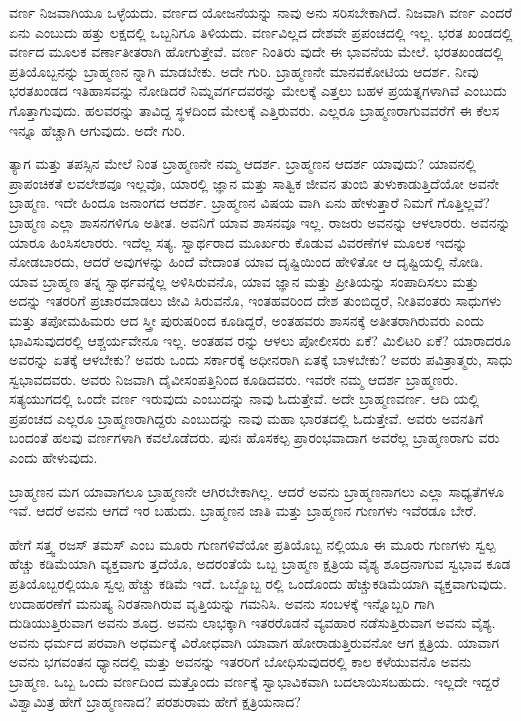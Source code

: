 ವರ್ಣ ನಿಜವಾಗಿಯೂ ಒಳ್ಳೆಯದು. ವರ್ಣದ ಯೋಜನೆಯನ್ನು ನಾವು ಅನು ಸರಿಸಬೇಕಾಗಿದೆ. ನಿಜವಾಗಿ ವರ್ಣ ಎಂದರೆ ಏನು ಎಂಬುದು ಹತ್ತು ಲಕ್ಷದಲ್ಲಿ ಒಬ್ಬನಿಗೂ ತಿಳಿಯದು. ವರ್ಣವಿಲ್ಲದ ದೇಶವೇ ಪ್ರಪಂಚದಲ್ಲಿ ಇಲ್ಲ. ಭರತ ಖಂಡದಲ್ಲಿ ವರ್ಣದ ಮೂಲಕ ವರ್ಣಾತೀತರಾಗಿ ಹೋಗುತ್ತೇವೆ. ವರ್ಣ ನಿಂತಿರು ವುದೇ ಈ ಭಾವನೆಯ ಮೇಲೆ. ಭರತಖಂಡದಲ್ಲಿ ಪ್ರತಿಯೊಬ್ಬನನ್ನು ಬ್ರಾಹ್ಮಣನ ನ್ನಾಗಿ ಮಾಡಬೇಕು. ಅದೇ ಗುರಿ. ಬ್ರಾಹ್ಮಣನೇ ಮಾನವಕೋಟಿಯ ಆದರ್ಶ. ನೀವು ಭರತಖಂಡದ ಇತಿಹಾಸವನ್ನು ನೋಡಿದರೆ ನಿಮ್ನವರ್ಗದವರನ್ನು ಮೇಲಕ್ಕೆ ಎತ್ತಲು ಬಹಳ ಪ್ರಯತ್ನಗಳಾಗಿವೆ ಎಂಬುದು ಗೊತ್ತಾಗುವುದು. ಹಲವರನ್ನು ತಾವಿದ್ದ ಸ್ಥಳದಿಂದ ಮೇಲಕ್ಕೆ ಎತ್ತಿರುವರು. ಎಲ್ಲರೂ ಬ್ರಾಹ್ಮಣರಾಗುವವರೆಗೆ ಈ ಕೆಲಸ ಇನ್ನೂ ಹೆಚ್ಚಾಗಿ ಆಗುವುದು. ಅದೇ ಗುರಿ.

ತ್ಯಾಗ ಮತ್ತು ತಪಸ್ಸಿನ ಮೇಲೆ ನಿಂತ ಬ್ರಾಹ್ಮಣನೇ ನಮ್ಮ ಆದರ್ಶ. ಬ್ರಾಹ್ಮಣನ ಆದರ್ಶ ಯಾವುದು? ಯಾವನಲ್ಲಿ ಪ್ರಾಪಂಚಿಕತೆ ಲವಲೇಶವೂ ಇಲ್ಲವೊ, ಯಾರಲ್ಲಿ ಜ್ಞಾನ ಮತ್ತು ಸಾತ್ವಿಕ ಜೀವನ ತುಂಬಿ ತುಳುಕಾಡುತ್ತಿದೆಯೋ ಅವನೇ ಬ್ರಾಹ್ಮಣ. ಇದೇ ಹಿಂದೂ ಜನಾಂಗದ ಆದರ್ಶ. ಬ್ರಾಹ್ಮಣನ ವಿಷಯ ವಾಗಿ ಏನು ಹೇಳುತ್ತಾರೆ ನಿಮಗೆ ಗೊತ್ತಿಲ್ಲವೆ? ಬ್ರಾಹ್ಮಣ ಎಲ್ಲಾ ಶಾಸನಗಳಿಗೂ ಅತೀತ. ಅವನಿಗೆ ಯಾವ ಶಾಸನವೂ ಇಲ್ಲ. ರಾಜರು ಅವನನ್ನು ಆಳಲಾರರು. ಅವನನ್ನು ಯಾರೂ ಹಿಂಸಿಸಲಾರರು. ಇದೆಲ್ಲ ಸತ್ಯ. ಸ್ವಾರ್ಥರಾದ ಮೂರ್ಖರು ಕೊಡುವ ವಿವರಣೆಗಳ ಮೂಲಕ ಇದನ್ನು ನೋಡಬಾರದು, ಆದರೆ ಅವುಗಳನ್ನು ಹಿಂದೆ ವೇದಾಂತ ಯಾವ ದೃಷ್ಟಿಯಿಂದ ಹೇಳಿತೋ ಆ ದೃಷ್ಟಿಯಲ್ಲಿ ನೋಡಿ. ಯಾವ ಬ್ರಾಹ್ಮಣ ತನ್ನ ಸ್ವಾರ್ಥವನ್ನೆಲ್ಲ ಅಳಿಸಿರುವನೊ, ಯಾವ ಜ್ಞಾನ ಮತ್ತು ಪ್ರೀತಿಯನ್ನು ಸಂಪಾದಿಸಲು ಮತ್ತು ಅದನ್ನು ಇತರರಿಗೆ ಪ್ರಚಾರಮಾಡಲು ಜೀವಿ ಸಿರುವನೊ, ಇಂತಹವರಿಂದ ದೇಶ ತುಂಬಿದ್ದರೆ, ನೀತಿವಂತರು ಸಾಧುಗಳು ಮತ್ತು ತಪೋಮಹಿಮರು ಆದ ಸ್ತ್ರೀ ಪುರುಷರಿಂದ ಕೂಡಿದ್ದರೆ, ಅಂತಹವರು ಶಾಸನಕ್ಕೆ ಅತೀತರಾಗಿರುವರು ಎಂದು ಭಾವಿಸುವುದರಲ್ಲಿ ಆಶ್ಚರ್ಯವೇನೂ ಇಲ್ಲ. ಅಂತಹವ ರನ್ನು ಆಳಲು ಪೋಲೀಸರು ಏಕೆ? ಮಿಲಿಟರಿ ಏಕೆ? ಯಾರಾದರೂ ಅವರನ್ನು ಏತಕ್ಕೆ ಆಳಬೇಕು? ಅವರು ಒಂದು ಸರ್ಕಾರಕ್ಕೆ ಅಧೀನರಾಗಿ ಏತಕ್ಕೆ ಬಾಳಬೇಕು? ಅವರು ಪವಿತ್ರಾತ್ಮರು, ಸಾಧು ಸ್ವಭಾವದವರು. ಅವರು ನಿಜವಾಗಿ ದೈವೀಸಂಪತ್ತಿನಿಂದ ಕೂಡಿದವರು. ಇವರೇ ನಮ್ಮ ಆದರ್ಶ ಬ್ರಾಹ್ಮಣರು. ಸತ್ಯಯುಗದಲ್ಲಿ ಒಂದೇ ವರ್ಣ ಇರುವುದು ಎಂಬುದನ್ನು ನಾವು ಓದುತ್ತೇವೆ. ಅದೇ ಬ್ರಾಹ್ಮಣವರ್ಣ. ಆದಿ ಯಲ್ಲಿ ಪ್ರಪಂಚದ ಎಲ್ಲರೂ ಬ್ರಾಹ್ಮಣರಾಗಿದ್ದರು ಎಂಬುದನ್ನು ನಾವು ಮಹಾ ಭಾರತದಲ್ಲಿ ಓದುತ್ತೇವೆ. ಅವರು ಅವನತಿಗೆ ಬಂದಂತೆ ಹಲವು ವರ್ಣಗಳಾಗಿ ಕವಲೊಡೆದರು. ಪುನಃ ಹೊಸಕಲ್ಪ ಪ್ರಾರಂಭವಾದಾಗ ಅವರೆಲ್ಲ ಬ್ರಾಹ್ಮಣರಾಗು ವರು ಎಂದು ಹೇಳುವುದು.

ಬ್ರಾಹ್ಮಣನ ಮಗ ಯಾವಾಗಲೂ ಬ್ರಾಹ್ಮಣನೇ ಆಗಿರಬೇಕಾಗಿಲ್ಲ. ಆದರೆ ಅವನು ಬ್ರಾಹ್ಮಣನಾಗಲು ಎಲ್ಲಾ ಸಾಧ್ಯತೆಗಳೂ ಇವೆ. ಆದರೆ ಅವನು ಆಗದೆ ಇರ ಬಹುದು. ಬ್ರಾಹ್ಮಣನ ಜಾತಿ ಮತ್ತು ಬ್ರಾಹ್ಮಣನ ಗುಣಗಳು ಇವೆರಡೂ ಬೇರೆ.

ಹೇಗೆ ಸತ್ತ್ವ ರಜಸ್ ತಮಸ್ ಎಂಬ ಮೂರು ಗುಣಗಳಿವೆಯೋ ಪ್ರತಿಯೊಬ್ಬ ನಲ್ಲಿಯೂ ಈ ಮೂರು ಗುಣಗಳು ಸ್ವಲ್ಪ ಹೆಚ್ಚು ಕಡಿಮೆಯಾಗಿ ವ್ಯಕ್ತವಾಗು ತ್ತದೆಯೊ, ಅದರಂತೆಯೆ ಒಬ್ಬ ಬ್ರಾಹ್ಮಣ ಕ್ಷತ್ರಿಯ ವೈಶ್ಯ ಶೂದ್ರನಾಗುವ ಸ್ವಭಾವ ಕೂಡ ಪ್ರತಿಯೊಬ್ಬರಲ್ಲಿಯೂ ಸ್ವಲ್ಪ ಹೆಚ್ಚು ಕಡಿಮೆ ಇದೆ. ಒಬ್ಬೊಬ್ಬ ರಲ್ಲಿ ಒಂದೊಂದು ಹೆಚ್ಚುಕಡಿಮೆಯಾಗಿ ವ್ಯಕ್ತವಾಗುವುದು. ಉದಾಹರಣೆಗೆ ಮನುಷ್ಯ ನಿರತನಾಗಿರುವ ವೃತ್ತಿಯನ್ನು ಗಮನಿಸಿ. ಅವನು ಸಂಬಳಕ್ಕೆ ಇನ್ನೊಬ್ಬರಿ ಗಾಗಿ ದುಡಿಯುತ್ತಿರುವಾಗ ಅವನು ಶೂದ್ರ. ಅವನು ಲಾಭಕ್ಕಾಗಿ ಇತರರೊಡನೆ ವ್ಯವಹಾರ ನಡೆಸುತ್ತಿರುವಾಗ ಅವನು ವೈಶ್ಯ. ಅವನು ಧರ್ಮದ ಪರವಾಗಿ ಅಧರ್ಮಕ್ಕೆ ವಿರೋಧವಾಗಿ ಯಾವಾಗ ಹೋರಾಡುತ್ತಿರುವನೋ ಆಗ ಕ್ಷತ್ರಿಯ. ಯಾವಾಗ ಅವನು ಭಗವಂತನ ಧ್ಯಾನದಲ್ಲಿ ಮತ್ತು ಅವನನ್ನು ಇತರರಿಗೆ ಬೋಧಿಸುವುದರಲ್ಲಿ ಕಾಲ ಕಳೆಯುವನೊ ಅವನು ಬ್ರಾಹ್ಮಣ. ಒಬ್ಬ ಒಂದು ವರ್ಣದಿಂದ ಮತ್ತೊಂದು ವರ್ಣಕ್ಕೆ ಸ್ವಾಭಾವಿಕವಾಗಿ ಬದಲಾಯಿಸಬಹುದು. ಇಲ್ಲದೇ ಇದ್ದರೆ ವಿಶ್ವಾಮಿತ್ರ ಹೇಗೆ ಬ್ರಾಹ್ಮಣನಾದ? ಪರಶುರಾಮ ಹೇಗೆ ಕ್ಷತ್ರಿಯನಾದ?

